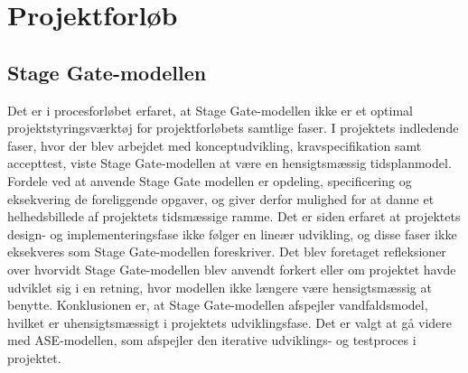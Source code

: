 \chapter{Projektforløb}

\section{Stage Gate-modellen}
Det er i procesforløbet erfaret, at Stage Gate-modellen ikke er et optimal  projektstyringsværktøj for projektforløbets samtlige faser.
I projektets indledende faser, hvor der blev arbejdet med konceptudvikling, kravspecifikation samt accepttest, viste Stage Gate-modellen at være en hensigtsmæssig tidsplanmodel. Fordele ved at anvende Stage Gate modellen er opdeling, specificering og eksekvering de foreliggende opgaver, og giver derfor mulighed for at danne et helhedsbillede af projektets tidsmæssige ramme. Det er siden erfaret at projektets design- og implementeringsfase ikke følger en lineær udvikling, og disse faser ikke eksekveres som Stage Gate-modellen foreskriver. Det blev foretaget refleksioner over hvorvidt Stage Gate-modellen blev anvendt forkert eller om projektet havde udviklet sig i en retning, hvor modellen ikke længere være hensigtsmæssig at benytte. Konklusionen er, at Stage Gate-modellen afspejler vandfaldsmodel, hvilket er uhensigtsmæssigt i projektets udviklingsfase. Det er valgt at gå videre med ASE-modellen, som afspejler den iterative udviklings- og testproces i projektet. 


